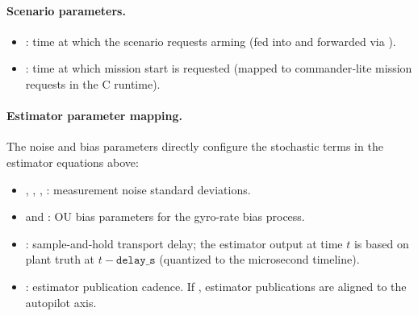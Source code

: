 \paragraph{Scenario parameters.}
\begin{itemize}[leftmargin=*,itemsep=2pt]
  \item {}: time at which the scenario requests arming (fed into  and forwarded via ).
  \item {}: time at which mission start is requested (mapped to commander‑lite mission requests in the C runtime).
\end{itemize}

\paragraph{Estimator parameter mapping.}
The noise and bias parameters directly configure the stochastic terms in the estimator equations above:
\begin{itemize}[leftmargin=*,itemsep=2pt]
  \item {}, , , : measurement noise standard deviations.
  \item {} and : OU bias parameters for the gyro-rate bias process.
  \item {}: sample-and-hold transport delay; the estimator output at time \(t\) is based on plant truth at \(t-\texttt{delay\_s}\) (quantized to the microsecond timeline).
  \item {}: estimator publication cadence. If , estimator publications are aligned to the autopilot axis.
\end{itemize}
